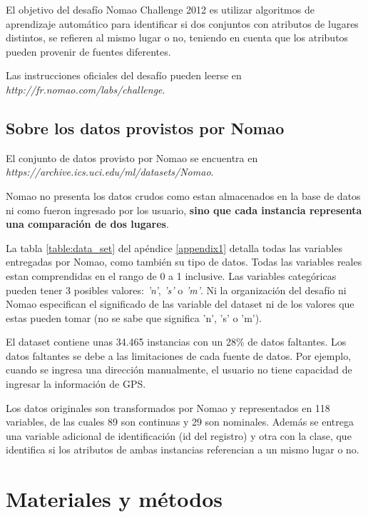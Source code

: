\documentclass[journal]{IEEEtran}
\begin{document}
El objetivo del desafío Nomao Challenge 2012 es utilizar 
algoritmos de aprendizaje automático para identificar si 
dos conjuntos con atributos de lugares distintos, se refieren al mismo
lugar o no, teniendo en cuenta que los atributos 
pueden provenir de fuentes diferentes.

Las instrucciones oficiales del desafío pueden leerse en 
\textit{http://fr.nomao.com/labs/challenge}.

\subsection{Sobre los datos provistos por Nomao}

El conjunto de datos provisto por Nomao se encuentra en
\textit{https://archive.ics.uci.edu/ml/datasets/Nomao}. 

Nomao no presenta los datos crudos como estan almacenados en la 
base de datos ni como fueron ingresado por los usuario, \textbf{sino que  
cada instancia representa una comparación de 
dos lugares}. 

La tabla \ref{table:data_set} del apéndice \ref{appendix1} 
detalla todas las variables entregadas por 
Nomao, como también su tipo de datos. Todas las variables reales estan comprendidas
en el rango de 0 a 1 inclusive. Las variables
categóricas pueden tener 3 posibles valores: \textit{'n'}, \textit{'s'} 
o \textit{'m'}. Ni la organización del desafío ni Nomao especifican 
el significado de las variable del dataset ni de los valores
que estas pueden tomar (no se sabe que significa 'n', 's' o 'm').

El dataset contiene unas 34.465 instancias con un 28\% de datos faltantes.
Los datos faltantes se debe a las limitaciones de cada fuente de datos. Por
ejemplo, cuando se ingresa una dirección manualmente, el usuario no tiene
capacidad de ingresar la información de GPS.

Los datos originales son transformados por Nomao y representados
en 118 variables, de las cuales 89 son continuas y 29 son
nominales. Además se entrega una variable adicional de identificación 
(id del registro) y
otra con la clase, que identifica si los atributos de ambas 
instancias referencian a un mismo lugar o no. 

\section{Materiales y métodos}
\end{document}
